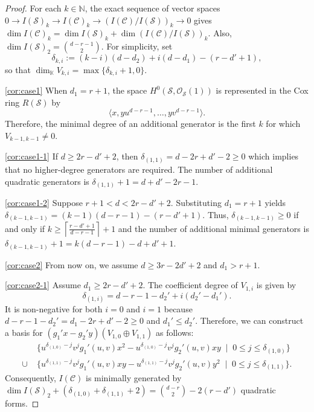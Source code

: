 \documentclass[a4paper, 11pt]{amsart}
\numberwithin{theorem}{section}
\theoremstyle{definition}
\numberwithin{equation}{section}
\begin{document}
\begin{proof}
For each $k\in\mathbb N$, the exact sequence of vector spaces $0\to I(\mathcal S)_k\to I(\mathcal C)_k\to (I(\mathcal C)/I(\mathcal S))_k\to0$ gives $\dim I(\mathcal C)_k=\dim I(\mathcal S)_k+\dim(I(\mathcal C)/I(\mathcal S))_k$.
Also, $\dim I(\mathcal S)_2=\binom{d-r-1}{2}$.
For simplicity, set
\[
\delta_{k,i}:=(k-i)(d-d_2)+i(d-d_1)-(r-d'+1),
\]
so that $\dim_{\mathbb K}V_{k,i}=\max\{\delta_{k,i}+1,0\}$.

\medskip
\noindent\eqref{cor:case1}
When $d_1 = r+1$, the space $H^0(\mathcal S,\mathcal O_{\mathcal S}(1))$ is represented in the Cox ring $R(\mathcal S)$ by 
\[
\langle x, yu^{d-r-1}, \dots, yv^{d-r-1}\rangle.
\]
Therefore, the minimal degree of an additional generator is the first $k$ for which $V_{k-1,k-1} \not= 0$.

\eqref{cor:case1-1}
If $d \geq 2r-d'+2$, then $\delta_{(1,1)} = d-2r+d'-2 \geq 0$ which implies that no higher-degree generators are required.
The number of additional quadratic generators is $\delta_{(1,1)}+1 = d+d'-2r-1$. 

\eqref{cor:case1-2}
Suppose $r+1 < d < 2r-d'+2$.
Substituting $d_1 = r+1$ yields $\delta_{(k-1,k-1)} = (k-1)(d-r-1)-(r-d'+1)$. 
Thus, $\delta_{(k-1,k-1)} \geq 0$ if and only if $k \geq \left\lceil \frac{r-d'+1}{d-r-1} \right\rceil+1$ and the number of additional minimal generators is $\delta_{(k-1,k-1)}+1 = k(d-r-1)-d+d'+1$.

\medskip
\noindent\eqref{cor:case2}
From now on, we assume $d \geq 3r-2d'+2$ and $d_1>r+1$.

\eqref{cor:case2-1}
Assume $d_1 \geq 2r-d'+2$. 
The coefficient degree of $V_{1,i}$ is given by
\[
\delta_{(1,i)} = d-r-1-d_2'+i(d_2'-d_1').
\]
It is non-negative for both $i = 0$ and $i = 1$ because $d-r-1-d_2' = d_1-2r+d'-2 \geq 0$ and $d_1' \leq d_2'$. Therefore, we can construct a basis for $(g_1'x-g_2'y)(V_{1,0} \oplus V_{1,1})$ as follows:
\begin{align*}
    &\{u^{\delta_{(1,0)}-j} v^j g_1'(u,v) x^2 - u^{\delta_{(1,0)}-j} v^j g_2'(u,v) x y \;\mid\; 0 \leq j \leq \delta_{(1,0)}\} \\
    \cup \; &\{u^{\delta_{(1,1)}-j} v^j g_1'(u,v) x y - u^{\delta_{(1,1)}-j} v^j g_2'(u,v) y^2 \;\mid\; 0 \leq j \leq \delta_{(1,1)}\}.
\end{align*}
Consequently, $I(\mathcal{C})$ is minimally generated by $\dim I(\mathcal{S})_2 + (\delta_{(1,0)}+\delta_{(1,1)}+2) = \binom{d-r}{2} - 2(r-d')$ quadratic forms.


\end{proof}
\end{document}
